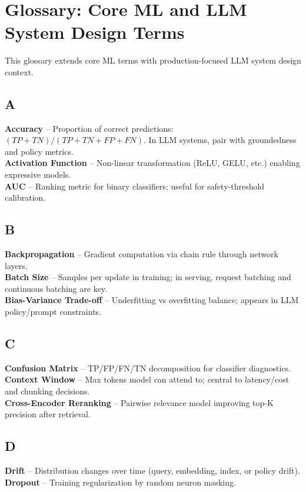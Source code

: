 \chapter{Glossary: Core ML and LLM System Design Terms}

This glossary extends core ML terms with production-focused LLM system design context.

\section*{A}
\textbf{Accuracy} -- Proportion of correct predictions: $(TP + TN)/(TP + TN + FP + FN)$. In LLM systems, pair with groundedness and policy metrics.\\
\textbf{Activation Function} -- Non-linear transformation (ReLU, GELU, etc.) enabling expressive models.\\
\textbf{AUC} -- Ranking metric for binary classifiers; useful for safety-threshold calibration.

\section*{B}
\textbf{Backpropagation} -- Gradient computation via chain rule through network layers.\\
\textbf{Batch Size} -- Samples per update in training; in serving, request batching and continuous batching are key.\\
\textbf{Bias-Variance Trade-off} -- Underfitting vs overfitting balance; appears in LLM policy/prompt constraints.

\section*{C}
\textbf{Confusion Matrix} -- TP/FP/FN/TN decomposition for classifier diagnostics.\\
\textbf{Context Window} -- Max tokens model can attend to; central to latency/cost and chunking decisions.\\
\textbf{Cross-Encoder Reranking} -- Pairwise relevance model improving top-K precision after retrieval.

\section*{D}
\textbf{Drift} -- Distribution changes over time (query, embedding, index, or policy drift).\\
\textbf{Dropout} -- Training regularization by random neuron masking.

